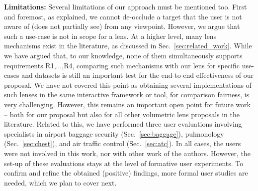 \vspace{0.15cm}
\noindent\textbf{Limitations:} Several limitations of our approach must be mentioned too. First and foremost, as explained, we cannot de-occlude a target that the user is not aware of (does not partially see) from any viewpoint. However, we argue that such a use-case is not in scope for a lens. At a higher level, many lens mechanisms exist in the literature, as discussed in Sec.~\ref{sec:related_work}. While we have argued that, to our knowledge, none of them simultaneously supports requirements R1,$\ldots$,R4, comparing such mechanisms with our lens for specific use-cases and datasets is still an important test for the end-to-end effectiveness of our proposal. We have not covered this point as obtaining several implementations of such lenses in the same interactive framework or tool, for comparison fairness, is very challenging. However, this remains an important open point for future work -- both for our proposal but also for all other volumetric lens proposals in the literature. Related to this, we have performed three user evaluations involving specialists in airport baggage security (Sec.~\ref{sec:baggage}), pulmonology (Sec.~\ref{sec:chest}), and air traffic control (Sec.~\ref{sec:atc}). In all cases, the users were not involved in this work, nor with other work of the authors. However, the set-up of these evaluations stays at the level of formative user experiments. To confirm and refine the obtained (positive) findings, more formal user studies are needed, which we plan to cover next.
